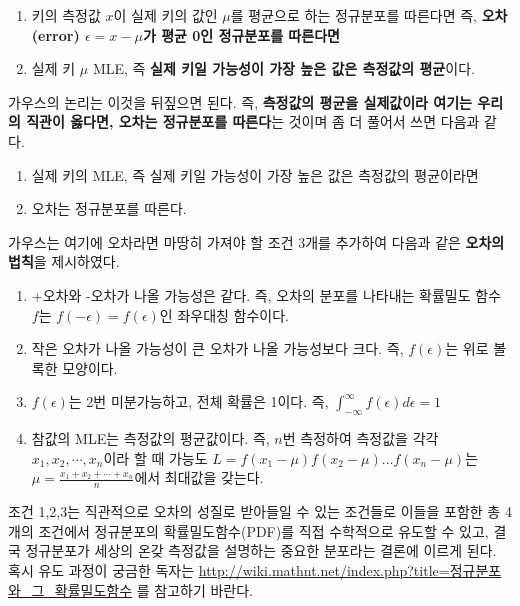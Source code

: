 \documentclass[]{book}
\providecommand{\tightlist}{%
  \setlength{\itemsep}{0pt}\setlength{\parskip}{0pt}}
\begin{document}
\begin{enumerate}
\def\labelenumi{\arabic{enumi}.}
\tightlist
\item
  키의 측정값 \(x\)이 실제 키의 값인 \(\mu\)를 평균으로 하는 정규분포를 따른다면 즉, \textbf{오차(error) \(\epsilon=x-\mu\)가 평균 0인 정규분포를 따른다면}
\item
  실제 키 \(\mu\) MLE, 즉 \textbf{실제 키일 가능성이 가장 높은 값은 측정값의 평균}이다.
\end{enumerate}

가우스의 논리는 이것을 뒤짚으면 된다. 즉, \textbf{측정값의 평균을 실제값이라 여기는 우리의 직관이 옳다면, 오차는 정규분포를 따른다}는 것이며 좀 더 풀어서 쓰면 다음과 같다.

\begin{enumerate}
\def\labelenumi{\arabic{enumi}.}
\tightlist
\item
  실제 키의 MLE, 즉 실제 키일 가능성이 가장 높은 값은 측정값의 평균이라면
\item
  오차는 정규분포를 따른다.
\end{enumerate}

가우스는 여기에 오차라면 마땅히 가져야 할 조건 3개를 추가하여 다음과 같은 \textbf{오차의 법칙}을 제시하였다.

\begin{enumerate}
\def\labelenumi{\arabic{enumi}.}
\tightlist
\item
  +오차와 -오차가 나올 가능성은 같다. 즉, 오차의 분포를 나타내는 확률밀도 함수 \(f\)는 \(f(-\epsilon)=f(\epsilon)\)인 좌우대칭 함수이다.\\
\item
  작은 오차가 나올 가능성이 큰 오차가 나올 가능성보다 크다. 즉, \(f(\epsilon)\)는 위로 볼록한 모양이다.
\item
  \(f(\epsilon)\)는 2번 미분가능하고, 전체 확률은 1이다. 즉, \(\int_{-\infty}^{\infty} f(\epsilon) d\epsilon=1\)
\item
  참값의 MLE는 측정값의 평균값이다. 즉, \(n\)번 측정하여 측정값을 각각 \(x_1, x_2, \cdots, x_n\)이라 할 때 가능도 \(L=f(x_1-\mu)f(x_2-\mu)\dots f(x_n-\mu)\)는 \(\mu=\frac{x_1+x_2+\cdots+x_n}{n}\)에서 최대값을 갖는다.
\end{enumerate}

조건 1,2,3는 직관적으로 오차의 성질로 받아들일 수 있는 조건들로 이들을 포함한 총 4개의 조건에서 정규분포의 확률밀도함수(PDF)를 직접 수학적으로 유도할 수 있고, 결국 정규분포가 세상의 온갖 측정값을 설명하는 중요한 분포라는 결론에 이르게 된다. 혹시 유도 과정이 궁금한 독자는 \url{http://wiki.mathnt.net/index.php?title=정규분포와_그_확률밀도함수} 를 참고하기 바란다.
\end{document}
